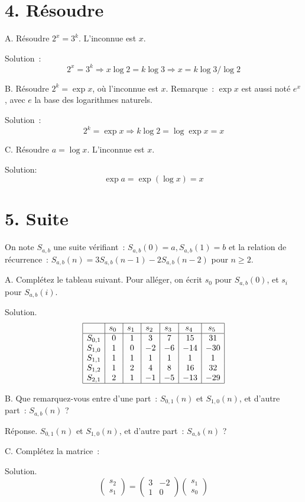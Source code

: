 \documentclass[11pt]{article}
\begin{document}
{
\section*{4. Résoudre}
A. Résoudre $2^x= 3^k$. L'inconnue est $x$.

Solution~:
$$2^x= 3^k\Rightarrow x \log 2 = k \log 3 \Rightarrow x = k \log 3 / \log 2$$


B. Résoudre $2^k= \exp x$, où l'inconnue est $x$. Remarque~: $\exp x$ est aussi noté $e^x$, avec $e$ la base des logarithmes naturels.  

Solution~:
$$2^k= \exp x \Rightarrow k \log 2 = \log \exp x = x $$

C. Résoudre $a=\log x$. L'inconnue est $x$.

Solution:
$$\exp a= \exp (\log x) = x$$
}

\section*{5. Suite}
On note $S_{a,b}$ une suite vérifiant~: $S_{a,b}(0)=a, S_{a,b}(1)=b$
et  la relation de récurrence~: $S_{a,b}(n)= 3 S_{a,b}(n-1) - 2 S_{a,b}(n-2)$ pour $n\ge 2$.


A. Complétez le tableau suivant. Pour alléger, on écrit $s_0$ pour $S_{a,b}(0)$,
et $s_i$ pour $S_{a,b}(i)$.


Solution.
$$
\begin{array}{|c|c|c|c|c|c|c|}
\hline
& s_0\; &  s_1\; & s_2\;  & s_3\;  & s_4\;  & s_5\;  \\
\hline
S_{0,1} & 0 & 1 & 3 & 7  & 15 & 31 \\
S_{1,0} & 1 & 0 & -2 & -6 & -14 & -30  \\
S_{1,1} & 1 & 1 & 1 & 1 & 1 & 1 \\
S_{1,2} & 1 & 2 & 4 & 8 & 16 & 32 \\
S_{2,1} & 2 & 1 & -1 & -5 & -13 & -29\\
\hline
\end{array}
$$


B. Que remarquez-vous entre  d'une part~: 
$S_{0,1}(n)$ et $S_{1,0}(n)$,  et d'autre part~: $S_{a,b}(n)$ ?

Réponse. $S_{0,1}(n)$ et $S_{1,0}(n)$,  et d'autre part~: $S_{a,b}(n)$ ?

C.
Complétez la matrice~:

Solution. $$
\left( \begin{array}{c}
s_2 \\
s_1 \end{array} \right) = \left( \begin{array}{cc}
3 & -2 \\
1 & 0 \end{array} \right) \left( \begin{array}{c}
s_1 \\
s_0 \end{array} \right)
$$
\end{document}
